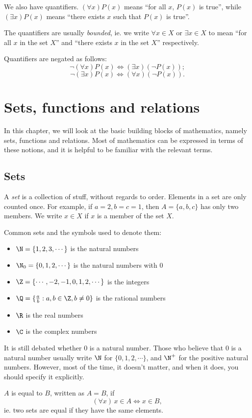 \documentclass[a4paper]{article}
\begin{document}
We also have quantifiers. $(\forall x) P(x)$ means ``for all $x$, $P(x)$ is true'', while $(\exists x) P(x)$ means ``there exists $x$ such that $P(x)$ is true''.

The quantifiers are usually \emph{bounded}, ie. we write $\forall x\in X$ or $\exists x\in X$ to mean ``for all $x$ in the set $X$'' and ``there exists $x$ in the set $X$'' respectively.

Quantifiers are negated as follows:
\[
  \neg (\forall x) P(x) \Leftrightarrow (\exists x)(\neg P(x));
\]
\[
  \neg (\exists x) P(x) \Leftrightarrow (\forall x)(\neg P(x)).
\]
\section{Sets, functions and relations}
In this chapter, we will look at the basic building blocks of mathematics, namely sets, functions and relations. Most of mathematics can be expressed in terms of these notions, and it is helpful to be familiar with the relevant terms.
\subsection{Sets}
\begin{defi}[Set]
  A \emph{set} is a collection of stuff, without regards to order. Elements in a set are only counted once. For example, if $a = 2, b = c = 1$, then $A = \{a, b, c\}$ has only two members. We write $x\in X$ if $x$ is a member of the set $X$.
\end{defi}

\begin{eg}
  Common sets and the symbols used to denote them:
  \begin{itemize}
    \item $\N = \{1, 2, 3, \cdots \}$ is the natural numbers
    \item $\N_0 = \{0, 1, 2, \cdots \}$ is the natural numbers with $0$
    \item $\Z = \{\cdots, -2, -1, 0, 1, 2, \cdots \}$ is the integers
    \item $\Q = \{\frac{a}{b}: a, b\in \Z, b \not= 0\}$ is the rational numbers
    \item $\R$ is the real numbers
    \item $\C$ is the complex numbers
  \end{itemize}
  It is still debated whether $0$ is a natural number. Those who believe that $0$ is a natural number usually write $\N$ for $\{0, 1, 2, \cdots\}$, and $\N^+$ for the positive natural numbers. However, most of the time, it doesn't matter, and when it does, you should specify it explicitly.
\end{eg}
\begin{defi}
  $A$ is equal to $B$, written as $A = B$, if
  \[
    (\forall x)\,x\in A \Leftrightarrow x\in B,
  \]
  ie. two sets are equal if they have the same elements.
\end{defi}
\end{document}
